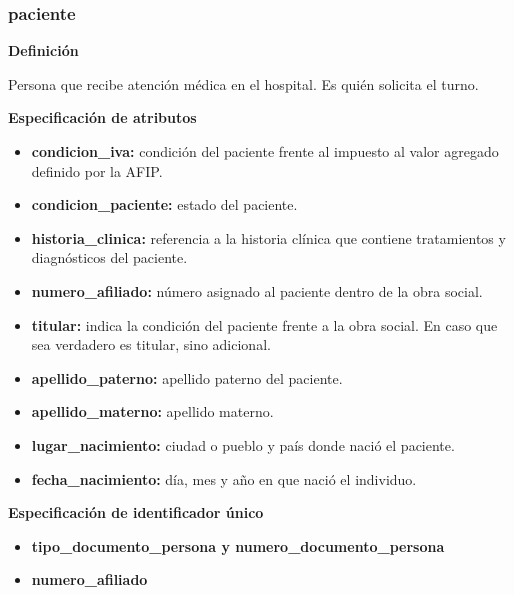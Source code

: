 \documentclass[a4paper,11pt]{article}
\begin{document}
\subsubsection{\textbf{paciente}}

\textbf{Definición}

Persona que recibe atención médica en el hospital. Es quién solicita el turno. 

\textbf{Especificación de atributos}

\begin{itemize}

  
   \item \textbf{condicion\_iva:} condición del paciente frente al impuesto al valor agregado 
   definido por la AFIP.

   \item \textbf{condicion\_paciente:} estado del paciente.

   \item \textbf{historia\_clinica:} referencia a la historia clínica que 
   contiene tratamientos y diagnósticos del paciente.

   \item \textbf{numero\_afiliado:} número asignado al paciente dentro de la obra social.

   \item \textbf{titular:} indica la condición del paciente frente a la obra social. En caso que sea verdadero es titular, sino adicional.
   
   \item \textbf{apellido\_paterno:} apellido paterno del paciente.

   \item \textbf{apellido\_materno:} apellido materno.
   
   \item \textbf{lugar\_nacimiento:} ciudad o pueblo y país donde nació el paciente.
	  
   \item \textbf{fecha\_nacimiento:} día, mes y año en que nació el individuo.
	
	\end{itemize}

\textbf{Especificación de identificador único}

\begin{itemize}

    \item \textbf{tipo\_documento\_persona y numero\_documento\_persona}

    \item \textbf{numero\_afiliado}

\end{itemize}
\end{document}
